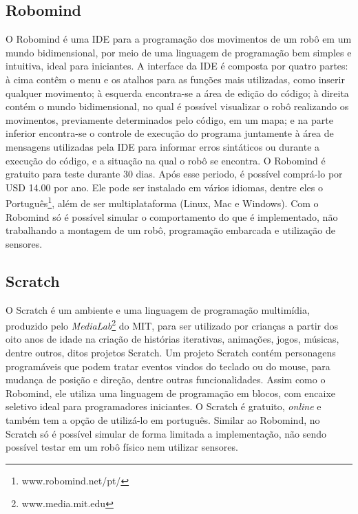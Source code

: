 \subsection{Robomind}
O Robomind é uma IDE para a programação dos movimentos de um robô em um mundo bidimensional, por meio de uma linguagem de programação bem simples e intuitiva, ideal para iniciantes. 
A interface da IDE é composta por quatro partes: à cima contêm o menu e os atalhos para as funções mais utilizadas, como inserir qualquer movimento; à esquerda encontra-se a área de  edição do código; à direita contém o mundo bidimensional, no qual é possível visualizar o robô realizando os movimentos, previamente determinados pelo código, em um mapa; e na parte inferior encontra-se o controle de execução do programa juntamente à área de mensagens utilizadas pela IDE para informar erros sintáticos ou durante a execução do código, e a situação na qual o robô se encontra. 
O Robomind é gratuito para teste durante 30 dias. Após esse periodo, é possível comprá-lo por USD 14.00 por ano. Ele pode ser instalado em vários idiomas, dentre eles o Português\footnote{www.robomind.net/pt/}, além de ser multiplataforma (Linux, Mac e Windows). 
Com o Robomind só é possível simular o comportamento do que é implementado, não trabalhando a montagem de um robô, programação embarcada e utilização de sensores.

\subsection{Scratch}
O Scratch é um ambiente e uma linguagem de programação multimídia, produzido pelo \textit{MediaLab}\footnote{www.media.mit.edu} do MIT, para ser utilizado por crianças a partir dos oito anos de idade na criação de histórias iterativas, animações, jogos, músicas, dentre outros, ditos projetos Scratch. 
Um projeto Scratch contém personagens programáveis que podem tratar eventos vindos do teclado ou do mouse, para mudança de posição e direção, dentre outras funcionalidades.
Assim como o Robomind, ele utiliza uma linguagem de programação em blocos, com encaixe seletivo ideal para programadores iniciantes. O Scratch é gratuito, \textit{online} e também tem a opção de utilizá-lo em português.
Similar ao Robomind, no Scratch só é possível simular de forma limitada a implementação, não sendo possível testar em um robô físico nem utilizar sensores.

